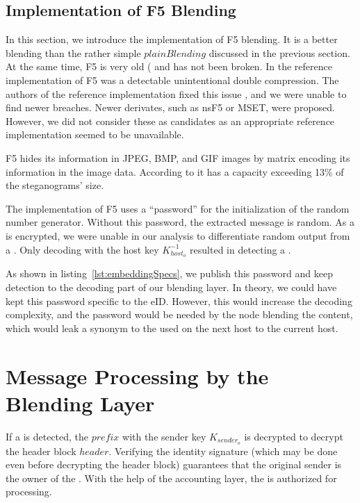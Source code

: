 \subsection{Implementation of F5 Blending}
In this section, we introduce the implementation of F5 blending. It is a better blending than the rather simple $plainBlending$ discussed in the previous section. At the same time, F5 is very old (\citeyear{f5} and has not been broken. In the reference implementation of F5 was a detectable unintentional double compression\cite{steganalysisf5}. The authors of the reference implementation fixed this issue \cite{F5broken}, and we were unable to find newer breaches. Newer derivates, such as nsF5\cite{fridrich2007statistically} or MSET\cite{hosseini2015modification}, were proposed. However, we did not consider these as candidates as an appropriate reference implementation seemed to be unavailable.

F5 hides its information in JPEG, BMP, and GIF images by matrix encoding its information in the image data. According to \cite{f5} it has a capacity exceeding 13\% of the steganograms' size.

The implementation of F5 uses a ``password'' for the initialization of the random number generator. Without this password, the extracted message is random. As a \VortexMessage{} is encrypted, we were unable in our analysis to differentiate random output from a \VortexMessage. Only decoding with the host key $K^{-1}_{host_o}$ resulted in detecting a \VortexMessage.

As shown in listing~\ref{lst:embeddingSpecs}, we publish this password and keep detection to the decoding part of our blending layer. In theory, we could have kept this password specific to the eID. However, this would increase the decoding complexity, and the password would be needed by the node blending the content, which would leak a synonym to the  used on the next host to the current host.

\section{Message Processing by the Blending Layer}
If a \VortexMessage{} is detected, the $prefix$ with the sender key $K_{sender_o}$ is decrypted to decrypt the header block $header$. Verifying the identity signature (which may be done even before decrypting the header block) guarantees that the original sender is the owner of the . With the help of the accounting layer, the \VortexMessage{} is authorized for processing. 

